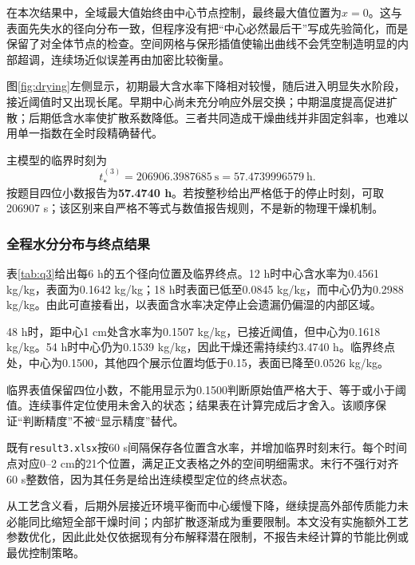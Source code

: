 在本次结果中，全域最大值始终由中心节点控制，最终最大值位置为$x=0$。这与表面先失水的径向分布一致，但程序没有把“中心必然最后干”写成先验简化，而是保留了对全体节点的检查。空间网格与保形插值使输出曲线不会凭空制造明显的内部超调，连续场近似误差再由加密比较衡量。


图\ref{fig:drying}左侧显示，初期最大含水率下降相对较慢，随后进入明显失水阶段，接近阈值时又出现长尾。早期中心尚未充分响应外层交换；中期温度提高促进扩散；后期低含水率使扩散系数降低。三者共同造成干燥曲线并非固定斜率，也难以用单一指数在全时段精确替代。

主模型的临界时刻为
\begin{equation}
t_*^{(3)}=206906.3987685\ \mathrm s
=57.4739996579\ \mathrm h .
\end{equation}
按题目四位小数报告为\textbf{57.4740 h}。若按整秒给出严格低于的停止时刻，可取206907 s；该区别来自严格不等式与数值报告规则，不是新的物理干燥机制。

\nextpage
\subsubsection{全程水分分布与终点结果}


表\ref{tab:q3}给出每6 h的五个径向位置及临界终点。12 h时中心含水率为0.4561 kg/kg，表面为0.1642 kg/kg；18 h时表面已低至0.0845 kg/kg，而中心仍为0.2988 kg/kg。由此可直接看出，以表面含水率决定停止会遗漏仍偏湿的内部区域。

48 h时，距中心1 cm处含水率为0.1507 kg/kg，已接近阈值，但中心为0.1618 kg/kg。54 h时中心仍为0.1539 kg/kg，因此干燥还需持续约3.4740 h。临界终点处，中心为0.1500，其他四个展示位置均低于0.15，表面已降至0.0526 kg/kg。

临界表值保留四位小数，不能用显示为0.1500判断原始值严格大于、等于或小于阈值。连续事件定位使用未舍入的状态；结果表在计算完成后才舍入。该顺序保证“判断精度”不被“显示精度”替代。

既有\texttt{result3.xlsx}按60 s间隔保存各位置含水率，并增加临界时刻末行。每个时间点对应0--2 cm的21个位置，满足正文表格之外的空间明细需求。末行不强行对齐60 s整数倍，因为其任务是给出连续模型定位的终点状态。

从工艺含义看，后期外层接近环境平衡而中心缓慢下降，继续提高外部传质能力未必能同比缩短全部干燥时间；内部扩散逐渐成为重要限制。本文没有实施额外工艺参数优化，因此此处仅依据现有分布解释潜在限制，不报告未经计算的节能比例或最优控制策略。

